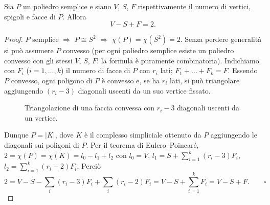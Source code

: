 \begin{teo}
Sia $P$ un poliedro semplice e siano $V$, $S$, $F$ rispettivamente il numero di vertici, spigoli e facce di $P$. Allora
\[
V - S + F = 2 .
\]
\end{teo}
\begin{proof}
$P$ semplice $\Rightarrow$ $P \cong S^2$ $\Rightarrow$ $\chi(P) = \chi(S^2) = 2$. Senza perdere generalit\`a si pu\`o assumere $P$ convesso (per ogni poliedro semplice esiste un poliedro convesso con gli stessi $V$, $S$, $F$: la formula \`e puramente combinatoria). Indichiamo con $F_i$ ($i = 1, \dots, k$) il numero di facce di $P$ con $r_i$ lati; $F_1 + \dots + F_k = F$. Essendo $P$ convesso, ogni poligono di $P$ \`e convesso e, se ha $r_i$ lati, si pu\`o triangolare aggiungendo $(r_i - 3)$ diagonali uscenti da un suo vertice fissato.

\begin{figure}[H]
    \centering
    \caption{Triangolazione di una faccia convessa con $r_i - 3$ diagonali uscenti da un vertice.}
\end{figure}

Dunque $P = |K|$, dove $K$ \`e il complesso simpliciale ottenuto da $P$ aggiungendo le diagonali sui poligoni di $P$. Per il teorema di Eulero--Poincar\'e, $2 = \chi(P) = \chi(K) = l_0 - l_1 + l_2$ con $l_0 = V$, $l_1 = S + \sum_{i=1}^k (r_i - 3)F_i$, $l_2 = \sum_{i=1}^k (r_i - 2)F_i$. Perci\`o
\[
2 = V - S - \sum_i (r_i - 3)F_i + \sum_i (r_i - 2)F_i = V - S + \sum_{i=1}^k F_i = V - S + F. \qquad \square
\]
\end{proof}

